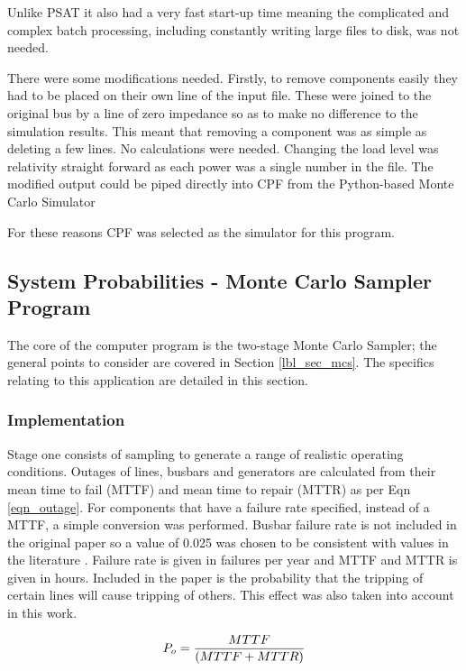 \documentclass[a4paper,oneside,12pt]{report}
\begin{document}
Unlike PSAT it also had a very fast start-up time meaning the complicated and complex batch processing, including constantly writing large files to disk, was not needed.

There were some modifications needed. Firstly, to remove components easily they had to be placed on their own line of the input file. These were joined to the original bus by a line of zero impedance so as to make no difference to the simulation results. This meant that removing a component was as simple as deleting a few lines. No calculations were needed. Changing the load level was relativity straight forward as each power was a single number in the file. The modified output could be piped directly into CPF from the Python-based Monte Carlo Simulator 

For these reasons CPF was selected as the simulator for this program.

\subsection{System Probabilities - Monte Carlo Sampler Program}\label{sec_mc_results}

The core of the computer program is the two-stage Monte Carlo Sampler; the general points to consider are covered in Section \ref{lbl_sec_mcs}. The specifics relating to this application are detailed in this section.

\subsubsection{Implementation}

Stage one consists of sampling to generate a range of realistic operating conditions. Outages of lines, busbars and generators are calculated from their mean time to fail (MTTF) and mean time to repair (MTTR) as per Eqn \ref{eqn_outage}. For components that have a failure rate specified, instead of a MTTF, a simple conversion was performed. Busbar failure rate is not included in the original paper so a value of 0.025 was chosen to be consistent with values in the literature \cite{Allan1991,Billinton1993,Brown2004,Evans1997}. Failure rate is given in failures per year and MTTF and MTTR is given in hours. Included in the paper is the probability that the tripping of certain lines will cause tripping of others. This effect was also taken into account in this work.

\begin{equation}
  \label{eqn_outage}
  P_o = {MTTF \over ( MTTF + MTTR )}
\end{equation}
\end{document}
